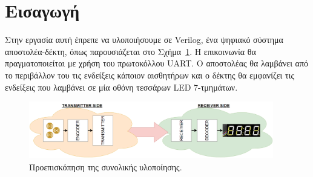 \documentclass[../main.tex]{subfiles}
\begin{document}
 
\section{Εισαγωγή}

Στην εργασία αυτή έπρεπε να υλοποιήσουμε σε Verilog, ένα ψηφιακό σύστημα
αποστολέα-δέκτη, όπως παρουσιάζεται στο Σχήμα~\ref{fig:complete_system}. Η
επικοινωνία θα πραγματοποιείται με χρήση του πρωτοκόλλου UART. Ο αποστολέας θα
λαμβάνει από το περιβάλλον του τις ενδείξεις κάποιον αισθητήρων και ο δέκτης θα
εμφανίζει τις ενδείξεις που λαμβάνει σε μία οθόνη τεσσάρων LED 7-τμημάτων.

\begin{figure}[H]
  \begin{center}
    \includegraphics[width=0.95\textwidth]{images/complete_system.png}
  \end{center}
  \caption{Προεπισκόπηση της συνολικής υλοποίησης.}
  \label{fig:complete_system}
\end{figure}
\end{document}
